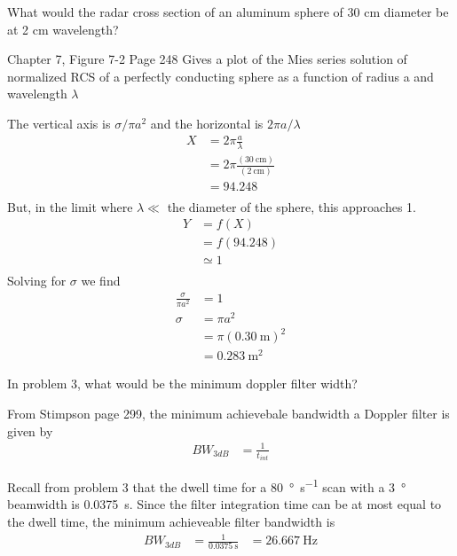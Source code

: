 \documentclass[12pt]{article}
\newenvironment{exercise}[2][Exercise]{\begin{trivlist}
    \item[\hskip \labelsep {\bfseries #1}\hskip \labelsep {\bfseries #2.}]}{\end{trivlist}}
\begin{document}
      \begin{exercise}{12}
      What would the radar cross section of an aluminum sphere of 30 cm diameter be at 2 cm wavelength?
      
      Chapter 7, Figure 7-2 Page 248
      Gives a plot of the Mies series solution of normalized RCS of a perfectly conducting sphere as a function of radius a and wavelength $\lambda$
      
      The vertical axis is $\sigma/\pi a^{2}$ and the horizontal is $2\pi a / \lambda$
      \begin{align*}
      X & = 2\pi\frac{ a}{\lambda}\\
      & = 2\pi\frac{(\SI{30}{\cm})}{(\SI{2}{\cm})}\\
      & = 94.248\\
      \end{align*}
      But, in the limit where $\lambda \ll$ the diameter of the sphere, this approaches 1.
      \begin{align*}
      Y &= f(X) \\
      & = f(94.248)\\
      & \simeq 1\\
      \end{align*}
      Solving for $\sigma$ we find
      \begin{align*}
      \frac{\sigma}{\pi a^{2}} & = 1 \\
      \sigma & = \pi a^{2}\\
      & = \pi (\SI{0.30}{\meter})^{2}\\
      & = \SI{0.283}{\meter\squared}
      \end{align*}
      \end{exercise}
      
      \begin{exercise}{13}
      In problem 3, what would be the minimum doppler filter width?

      From Stimpson page 299, the minimum achievebale bandwidth a Doppler filter is given by
      \begin{align*}
      BW_{3 dB} & = \frac{1}{t_{int}}
      \end{align*}

      Recall from problem 3 that the dwell time for a \SI{80}{\degree\per\second} scan with a \SI{3}{\degree} beamwidth is \SI{0.0375}{\second}.  Since the filter integration time can be at most equal to the dwell time, the minimum achieveable filter bandwidth is
      \begin{align*}
      BW_{3 dB} & = \frac{1}{ \SI{0.0375}{\second} }
      &= \SI{26.667}{\Hz}
      \end{align*}
      \end{exercise}
      
\end{document}
